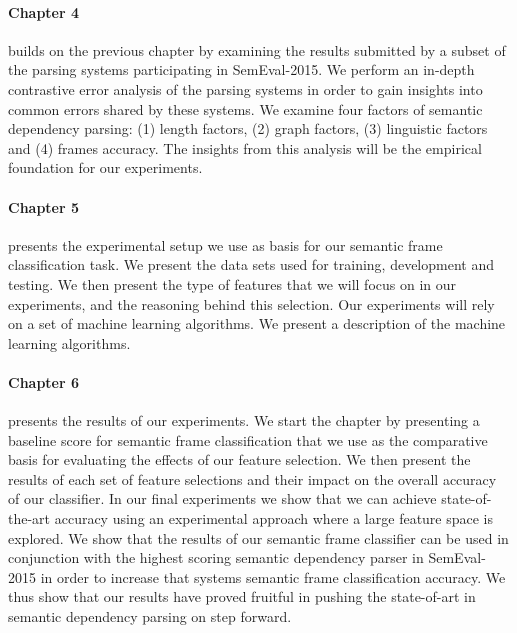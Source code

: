 \paragraph{Chapter 4} builds on the previous chapter by examining the results submitted by a subset of the parsing systems participating in SemEval-2015. We perform an in-depth contrastive error analysis of the parsing systems in order to gain insights into common errors shared by these systems. We examine four factors of semantic dependency parsing: (1) length factors, (2) graph factors, (3) linguistic factors and (4) frames accuracy. The insights from this analysis will be the empirical foundation for our experiments.

\paragraph{Chapter 5} presents the experimental setup we use as basis for our semantic frame classification task. We present the data sets used for training, development and testing. We then present the type of features that we will focus on in our experiments, and the reasoning behind this selection. Our experiments will rely on a set of machine learning algorithms. We present a description of the machine learning algorithms.


\paragraph{Chapter 6} presents the results of our experiments. We start the chapter by presenting a baseline score for semantic frame classification that we use as the comparative basis for evaluating the effects of our feature selection. We then present the results of each set of feature selections and their impact on the overall accuracy of our classifier. In our final experiments we show that we can achieve state-of-the-art accuracy using an experimental approach where a large feature space is explored. We show that the results of our semantic frame classifier can be used in conjunction with the highest scoring semantic dependency parser in SemEval-2015 in order to increase that systems semantic frame classification accuracy. We thus show that our results have proved fruitful in pushing the state-of-art in semantic dependency parsing on step forward.

